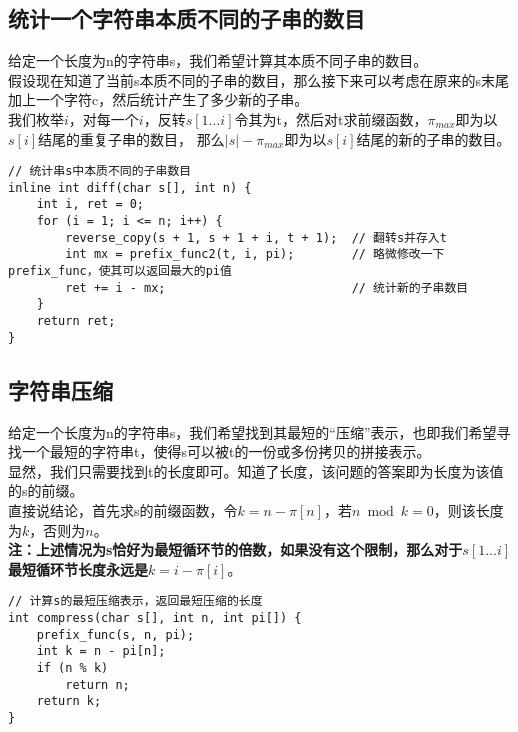     \subsection{统计一个字符串本质不同的子串的数目}
        给定一个长度为n的字符串s，我们希望计算其本质不同子串的数目。\\
        假设现在知道了当前s本质不同的子串的数目，那么接下来可以考虑在原来的s末尾加上一个字符c，然后统计产生了多少新的子串。\\
        我们枚举$i$，对每一个$i$，反转$s[1 \dots i]$令其为t，然后对t求前缀函数，$\pi_{max}$即为以$s[i]$结尾的重复子串的数目，
        那么$|s|-\pi_{max}$即为以$s[i]$结尾的新的子串的数目。
        \begin{lstlisting}
// 统计串s中本质不同的子串数目
inline int diff(char s[], int n) {
    int i, ret = 0;
    for (i = 1; i <= n; i++) {
        reverse_copy(s + 1, s + 1 + i, t + 1);  // 翻转s并存入t
        int mx = prefix_func2(t, i, pi);        // 略微修改一下prefix_func，使其可以返回最大的pi值
        ret += i - mx;                          // 统计新的子串数目
    }
    return ret;
}
        \end{lstlisting}
    \subsection{字符串压缩}
        给定一个长度为n的字符串s，我们希望找到其最短的“压缩”表示，也即我们希望寻找一个最短的字符串t，使得s可以被t的一份或多份拷贝的拼接表示。\\
        显然，我们只需要找到t的长度即可。知道了长度，该问题的答案即为长度为该值的s的前缀。\\
        直接说结论，首先求s的前缀函数，令$k=n-\pi[n]$，若$n \bmod k = 0$，则该长度为$k$，否则为$n$。\\
        \textbf{注：上述情况为s恰好为最短循环节的倍数，如果没有这个限制，那么对于$s[1 \dots i]$最短循环节长度永远是$k=i-\pi[i]$}。
        \begin{lstlisting}
// 计算s的最短压缩表示，返回最短压缩的长度
int compress(char s[], int n, int pi[]) {
    prefix_func(s, n, pi);
    int k = n - pi[n];
    if (n % k)
        return n;
    return k;
}
        \end{lstlisting}
